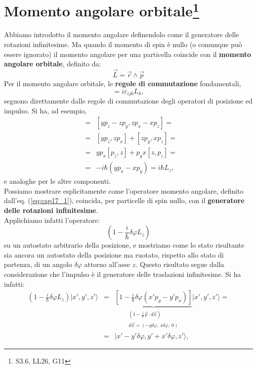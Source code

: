 \chapter[Momento angolare orbitale]{Momento angolare orbitale\footnote{S3.6, LL26, G11}}
Abbiamo introdotto il momento angolare definendolo come il generatore delle rotazioni infinitesime. Ma quando il momento di spin è nullo (o comunque può essere ignorato) il momento angolare per una particella coincide con il \textbf{momento angolare orbitale}, definito da:
\begin{equation}
\vec{L}=\vec{r}\wedge\vec{p}
\end{equation}
Per il momento angolare orbitale, le \textbf{regole di commutazione} fondamentali,
\begin{equation}
[L_i, L_j]= i \varepsilon _{ijk}L_k ,
\label{eq:cap17_1}
\end{equation}
seguono direttamente dalle regole di commutazione degli operatori di posizione ed impulso. Si ha, ad esempio,
\begin{eqnarray}
[L_x , L_y] &=& [y p_z - zp_y, zp_x -xp_z] = \nonumber \\
&=&[y p_z , zp_x] + [zp_y, xp_z] = \nonumber \\
&=& yp_x [p_z , z] + p_y x [z , p_z] = \nonumber  \\
&=& -i\hbar (yp_x -xp_y) = i\hbar L_z ,
\end{eqnarray}
e analoghe per le altre componenti.\\
Possiamo mostrare esplicitamente come l'operatore momento angolare, definito dall'eq. (\ref{eq:cap17_1}), coincida, per particelle di spin nullo, con il \textbf{generatore delle rotazioni infinitesime}.\\
Applichiamo infatti l'operatore:
\begin{equation}
\left(1- \frac{i}{\hbar}\delta \varphi L_z\right)
\end{equation}
su un autostato arbitrario della posizione, e mostriamo come lo stato risultante sia ancora un autostato della posizione ma ruotato, rispetto allo stato di partenza, di un angolo $\delta \varphi$ attorno all'asse $z$. Questo risultato segue dalla considerazione che l'impulso è il generatore delle traslazioni infinitesime. Si ha infatti:
\begin{eqnarray}
\left(1- \frac{i}{\hbar}\delta \varphi L_z\right)\vert x', y', z'\rangle &=& \underbrace{\left[1- \frac{i}{\hbar}\delta \varphi\left(x'p_y-y'p_x\right)\right]}_{\begin{array}{cc}
\scriptstyle{(1- \frac{i}{\hbar}\vec{p}\cdot d\vec{x})}\\
\scriptstyle{d\vec{x}= (-y\delta \varphi ,\ x \delta \varphi ,\ 0)}
\end{array}}\vert x', y', z'\rangle = \nonumber \\
&=&\vert x'-y'\delta \varphi , y'+x'\delta \varphi , z'\rangle ,
\end{eqnarray}
